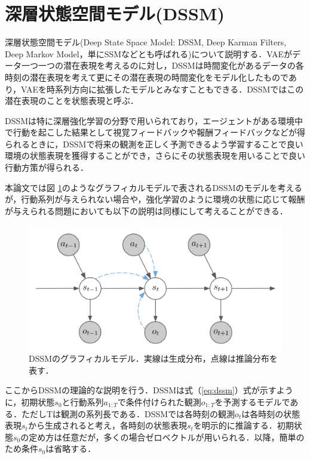 \clearpage
\section{深層状態空間モデル(DSSM)}
\label{section:dssm}

深層状態空間モデル(Deep State Space Model: DSSM, Deep Karman Filters, Deep Markov Model，単にSSMなどとも呼ばれる)\cite{krishnan2015deep}\cite{krishnan2017structured}について説明する．VAEがデータ一つ一つの潜在表現を考えるのに対し，DSSMは時間変化があるデータの各時刻の潜在表現を考えて更にその潜在表現の時間変化をモデル化したものであり，VAEを時系列方向に拡張したモデルとみなすこともできる．DSSMではこの潜在表現のことを状態表現と呼ぶ．

DSSMは特に深層強化学習の分野で用いられており，エージェントがある環境中で行動を起こした結果として視覚フィードバックや報酬フィードバックなどが得られるときに，DSSMで将来の観測を正しく予測できるよう学習することで良い環境の状態表現を獲得することができ，さらにその状態表現を用いることで良い行動方策が得られる\cite{hafner2019dream}．

\vspace{\baselineskip}
本論文では図 \ref{fig:ssm}のようなグラフィカルモデルで表されるDSSMのモデルを考えるが，行動系列が与えられない場合や，強化学習のように環境の状態に応じて報酬が与えられる問題においても以下の説明は同様にして考えることができる．

\begin{figure}[bp]
  \begin{center}
    \includegraphics[width=0.7\linewidth]{./figures/dssm.png}
    \caption[DSSMのグラフィカルモデル]{DSSMのグラフィカルモデル．実線は生成分布，点線は推論分布を表す．}
    \label{fig:ssm}
  \end{center}
\end{figure}

\vspace{\baselineskip}
ここからDSSMの理論的な説明を行う．DSSMは式（\ref{eq:dssm}）式が示すように，初期状態$s_0$と行動系列$a_{1:T}$で条件付けられた観測$o_{1:T}$を予測するモデルである．ただしTは観測の系列長である．DSSMでは各時刻の観測$o_t$は各時刻の状態表現$s_t$から生成されると考え，各時刻の状態表現$s_t$を明示的に推論する．初期状態$s_0$の定め方は任意だが，多くの場合ゼロベクトルが用いられる．以降，簡単のため条件$s_0$は省略する．

